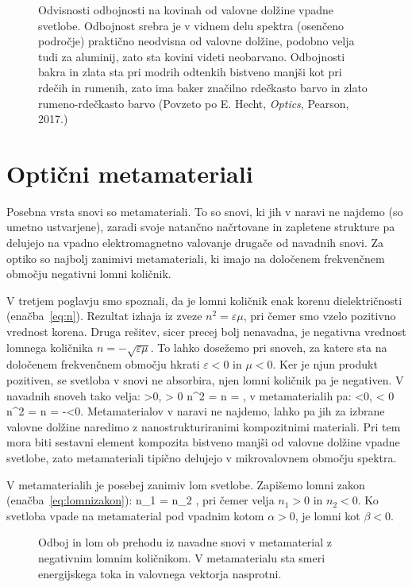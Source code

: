 \begin{figure}[h!]
\centering
\def\svgwidth{100truemm} 

\caption{Odvisnosti odbojnosti na kovinah od valovne dolžine vpadne svetlobe. Odbojnost
srebra je v vidnem delu spektra (osenčeno področje) praktično 
neodvisna od valovne dolžine, podobno velja tudi za aluminij, zato sta kovini
videti neobarvano. Odbojnosti bakra in zlata sta pri modrih odtenkih bistveno 
manjši kot pri rdečih in rumenih, zato ima baker značilno rdečkasto barvo in zlato
rumeno-rdečkasto barvo (Povzeto po E. Hecht, {\it Optics}, Pearson, 2017.)}
\label{fig:09_kovine}
\end{figure}

\section{Optični metamateriali}
Posebna vrsta snovi so metamateriali. To so snovi, ki jih v naravi ne najdemo (so umetno
ustvarjene), zaradi svoje natančno načrtovane in zapletene strukture pa delujejo na 
vpadno elektromagnetno valovanje drugače od navadnih snovi. Za optiko so najbolj zanimivi
metamateriali, ki imajo na določenem frekvenčnem območju negativni lomni količnik.

V tretjem poglavju smo spoznali, da je lomni količnik enak korenu dielektričnosti
(enačba~\ref{eq:n}). Rezultat izhaja iz zveze $n^2 = \varepsilon \mu$, pri čemer smo 
vzelo pozitivno vrednost korena. Druga rešitev, sicer precej bolj nenavadna, je negativna
vrednost lomnega količnika $n = - \sqrt{\varepsilon \mu}$. To lahko dosežemo pri snoveh,
za katere sta na določenem frekvenčnem območju hkrati $\varepsilon<0$ in $\mu<0$. 
Ker je njun produkt pozitiven, se svetloba v snovi ne absorbira, njen lomni količnik 
pa je negativen. V navadnih snoveh tako velja:
\beq
\varepsilon >0, \mu > 0 \qquad \Rightarrow \qquad n^2 = \varepsilon \mu 
\qquad \Rightarrow \qquad n = \sqrt{\varepsilon\mu},
\label{eq:09_37m}
\eeq
v metamaterialih pa:
\beq
\varepsilon <0, \mu < 0 \qquad \Rightarrow \qquad n^2 = \varepsilon \mu 
\qquad \Rightarrow \qquad n = -\sqrt{\varepsilon\mu}<0. 
\label{eq:09_38}
\eeq
Metamaterialov v naravi ne najdemo, lahko pa jih za izbrane valovne dolžine naredimo z
nanostrukturiranimi kompozitnimi materiali. Pri tem mora biti sestavni element kompozita
bistveno manjši od valovne dolžine vpadne svetlobe, zato metamateriali tipično delujejo v 
mikrovalovnem območju spektra.

V metamaterialih je posebej zanimiv lom svetlobe. Zapišemo lomni zakon 
(enačba~\ref{eq:lomnizakon}):
\beq
n_1 \sin\alpha = n_2 \sin\beta,
\label{eq:09_39}
\eeq
pri čemer velja $n_1>0$ in $n_2<0$. Ko svetloba vpade na metamaterial pod vpadnim
kotom $\alpha>0 $, je lomni kot $\beta <0$. 
\begin{figure}[h]
\centering
\def\svgwidth{80truemm} 

\caption{Odboj in lom ob prehodu iz navadne snovi v metamaterial z negativnim lomnim
količnikom. V metamaterialu sta smeri energijskega toka in valovnega vektorja nasprotni.}
\label{fig:09_meta}
\end{figure}

